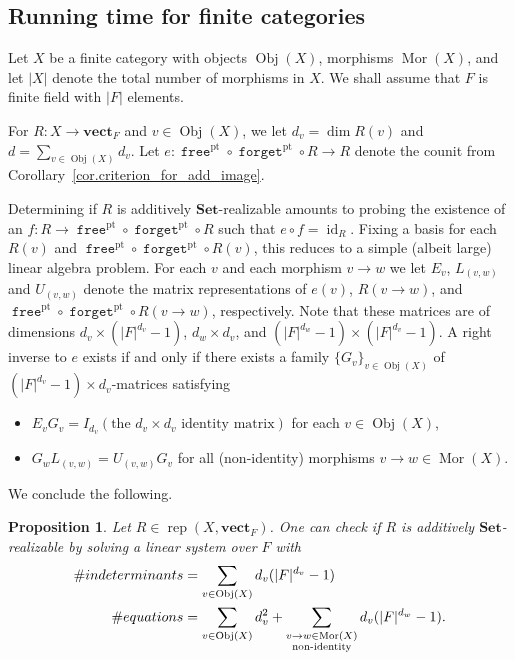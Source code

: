 \documentclass[a4paper]{amsart}
\theoremstyle{plain}
\newtheorem{proposition}[theorem]{Proposition}
\theoremstyle{definition}
\theoremstyle{remark}
\newcommand{\funct}[1]{\operatorname{\mathtt{#1}}}
\newcommand{\Set}{\mathbf{Set}}
\newcommand{\vectF}{\mathbf{vect}_F}
\DeclareMathOperator{\rep}{rep}
\begin{document}
\subsection{Running time for finite categories} \label{subsect:runtime}
Let $X$ be a finite category with objects $\operatorname{Obj}(X)$, morphisms $\operatorname{Mor}(X)$, and let $|X|$ denote the total number of morphisms in $X$. We shall assume that $F$ is finite field with $|F|$ elements.

For $R\colon X\to \vectF$ and $v\in \operatorname{Obj}(X)$, we let $d_v = \dim R(v)$ and $d = \sum_{v\in \operatorname{Obj}(X)} d_v$. Let $e\colon \funct{free}^\mathrm{pt} \circ \funct{forget}^\mathrm{pt} \circ R \to R$ denote the counit from Corollary~\ref{cor.criterion_for_add_image}. 


Determining if $R$ is additively $\Set$-realizable amounts to probing the existence of an $f\colon R\to \funct{free}^\mathrm{pt} \circ \funct{forget}^\mathrm{pt} \circ R$ such that $e \circ f = \operatorname{id}_R$.
Fixing a basis for each $R(v)$ and $\funct{free}^\mathrm{pt} \circ \funct{forget}^\mathrm{pt} \circ R(v)$, this reduces to a simple (albeit large) linear algebra problem. For each $v$ and each morphism $v\to w$ we let $E_v$, $L_{(v,w)}$ and $U_{(v,w)}$ denote the matrix representations of $e(v)$, $R(v\to w)$, and $\funct{free}^\mathrm{pt} \circ \funct{forget}^\mathrm{pt} \circ R(v\to w)$, respectively. Note that these matrices are of dimensions  $d_v\times (|F|^{d_v}-1)$, $d_w\times d_v$, and $(|F|^{d_w}-1)\times (|F|^{d_v}-1)$. A right inverse to $e$ exists if and only if there exists a family $\{G_v\}_{v\in \operatorname{Obj}(X)}$ of $(|F|^{d_v}-1)\times d_v$-matrices satisfying
\begin{itemize}
\item $E_vG_v = I_{d_v} (\text{the $d_v\times d_v$ identity matrix})$ for each $v\in \operatorname{Obj}(X)$, 
\item $G_wL_{(v,w)} = U_{(v,w)}G_v$ for all (non-identity) morphisms $v\to w\in \operatorname{Mor}(X)$. 
\end{itemize} 
We conclude the following.
\begin{proposition}\label{prop.sys_eq}
Let $R\in \rep(X,\vectF)$. One can check if $R$ is additively $\Set$-realizable by solving a linear system over $F$ with
\begin{align*}
\#{\rm indeterminants} &= \sum_{v\in \operatorname{Obj}(X)}d_v(|F|^{d_v}-1)  \\
\#{\rm equations} &= \sum_{v\in \operatorname{Obj}(X)}d_v^2 + \sum_{\substack{v\to w \in \operatorname{Mor}(X)\\ \text{non-identity}}} d_v(|F|^{d_w}-1).
\end{align*}
\end{proposition}
\end{document}
